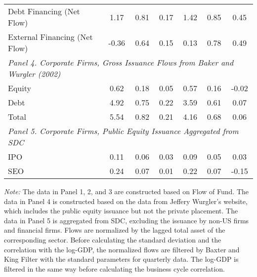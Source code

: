 \documentclass[11pt]{article}
\begin{document}
\begin{table}[htbp]
\begin{tabular}{lcccccc}
		Debt Financing (Net Flow) & 1.17  & 0.81  & 0.17  & 1.42  & 0.85  & 0.45 \\[0.5em]
		External Financing (Net Flow) & -0.36 & 0.64  & 0.15  & 0.13  & 0.78  & 0.49 \\
		\midrule
		\multicolumn{7}{l}{\textit{Panel 4. Corporate Firms, Gross Issuance Flows from Baker and Wurgler (2002)}} \\
		Equity & 0.62  & 0.18  & 0.05  & 0.57  & 0.16  & -0.02 \\
		Debt  & 4.92  & 0.75  & 0.22  & 3.59  & 0.61  & 0.07 \\
		Total & 5.54  & 0.82  & 0.21  & 4.16  & 0.68  & 0.06 \\
		\midrule
		\multicolumn{7}{l}{\textit{Panel 5. Corporate Firms, Public Equity Issuance Aggregated from SDC}} \\
		IPO & 0.11  & 0.06  & 0.03  & 0.09  & 0.05  & 0.03 \\
		SEO & 0.24  & 0.07  & 0.01  & 0.22  & 0.07  & -0.15 \\
		\bottomrule[1.5pt]
	\end{tabular}%
	\flushleft
	\textit{Note:} {\footnotesize The data in Panel 1, 2, and 3 are constructed based on Flow of Fund. The data in Panel 4 is constructed based on the data from Jeffery Wurgler's website, which includes the public equity issuance but not the private placement. The data in Panel 5 is aggregated from SDC, excluding the issuance by non-US firms and financial firms. Flows are normalized by the lagged total asset of the corresponding sector. Before calculating the standard deviation and the correlation with the log-GDP, the normalized flows are filtered by Baxter and King Filter with the standard parameters for quarterly data. The log-GDP is filtered in the same way before calculating the business cycle correlation. }
\end{table}%
\end{document}
